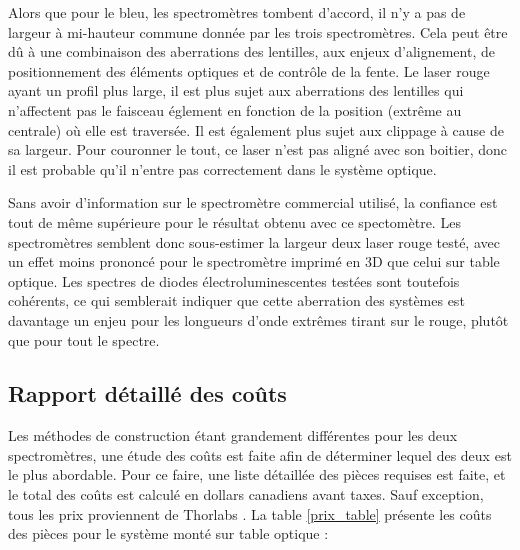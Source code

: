 \documentclass[11pt,letterpaper]{article}
\begin{document}
Alors que pour le bleu, les spectromètres tombent d'accord, il n'y a pas de largeur à mi-hauteur
commune donnée par les trois spectromètres. Cela peut être dû à une combinaison des aberrations 
des lentilles, aux enjeux d'alignement, de positionnement des éléments optiques et de contrôle de
la fente. Le laser rouge ayant un profil plus large, il est plus sujet aux aberrations des lentilles
qui n'affectent pas le faisceau églement en fonction de la position (extrême au centrale) où elle
est traversée. Il est également plus sujet aux clippage à cause de sa largeur. Pour couronner le tout,
ce laser n'est pas aligné avec son boitier, donc il est probable qu'il n'entre pas correctement dans
le système optique. 

Sans avoir d'information sur le spectromètre commercial utilisé, la confiance est tout de même supérieure
pour le résultat obtenu avec ce spectomètre. Les spectromètres semblent donc sous-estimer la largeur deux
laser rouge testé, avec un effet moins prononcé pour le spectromètre imprimé en 3D que celui sur table optique.
Les spectres de diodes électroluminescentes testées sont toutefois cohérents, ce qui semblerait indiquer que 
cette aberration des systèmes est davantage un enjeu pour les longueurs d'onde extrêmes tirant sur le rouge,
plutôt que pour tout le spectre. 




\subsection{Rapport détaillé des coûts}

Les méthodes de construction étant grandement différentes pour les deux spectromètres, une 
étude des coûts est faite afin de déterminer lequel des deux est le plus abordable. Pour ce
faire, une liste détaillée des pièces requises est faite, et le total des coûts est calculé en
dollars canadiens avant taxes. Sauf exception, tous les prix proviennent de Thorlabs \cite{noauthor_thorlabs_2024}. La table \ref{prix_table} présente les coûts des pièces pour
le système monté sur table optique :
\end{document}
